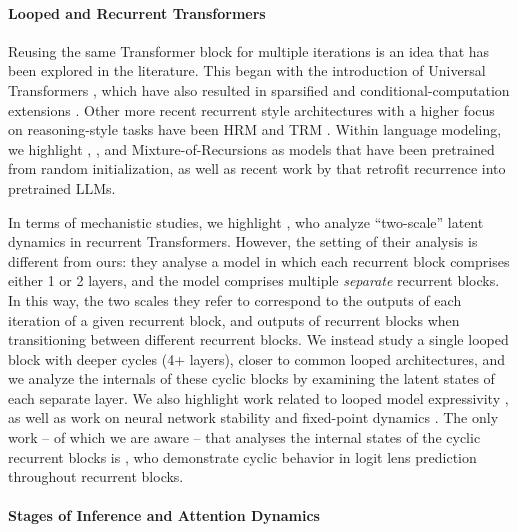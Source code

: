\paragraph{Looped and Recurrent Transformers}

Reusing the same Transformer block for multiple iterations is an idea that has been explored in the literature. This began with the introduction of Universal Transformers  \cite{dehghani2018universal}, which have also resulted in sparsified and conditional-computation extensions \cite{tan2023sparse,csordas2024moeut}. Other more recent recurrent style architectures with a higher focus on reasoning-style tasks have been HRM \cite{wang2025hierarchical} and TRM \cite{jolicoeur2025less}. Within language modeling, we highlight \raven{} \cite{geiping2025scaling}, \ouro{} \cite{zhu2025scaling}, and Mixture-of-Recursions \citep{bae2025mixture} as models that have been pretrained from random initialization, as well as recent work by \citep{mcleish2025teaching, koishekenov2025encode} that retrofit recurrence into pretrained LLMs.  

In terms of mechanistic studies, we highlight \citet{pappone2025two}, who analyze “two-scale” latent dynamics in recurrent Transformers. However, the setting of their analysis is different from ours: they analyse a model in which each recurrent block comprises either 1 or 2 layers, and the model comprises multiple \emph{separate} recurrent blocks. In this way, the two scales they refer to correspond to the outputs of each iteration of a given recurrent block, and outputs of recurrent blocks when transitioning between different recurrent blocks. We instead study a single looped block with deeper cycles (4+ layers), closer to common looped architectures, and we analyze the internals of these cyclic blocks by examining the latent states of each separate layer. We also highlight work related to looped model expressivity \citep{xu2024expressive, saunshi2025reasoning}, as well as work on neural network stability and fixed-point dynamics \citep{bai2019deep, anil2022path, ke2024advancing, yudin2025pay}. The only work -- of which we are aware -- that analyses the internal states of the cyclic recurrent blocks is \citet{lu2025latent}, who demonstrate cyclic behavior in logit lens prediction throughout recurrent blocks.



\paragraph{Stages of Inference and Attention Dynamics}

